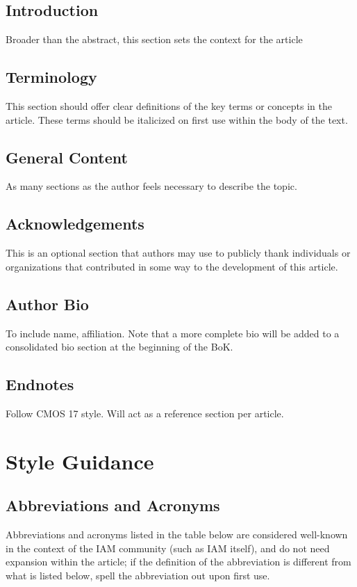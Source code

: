 \documentclass[]{article}
\begin{document}
\subsection{Introduction}
Broader than the abstract, this section sets the context for the article

\subsection{Terminology}
This section should offer clear definitions of the key terms or concepts in the article. These terms should be italicized on first use within the body of the text.

\subsection{General Content}
As many sections as the author feels necessary to describe the topic.

\subsection{Acknowledgements}
This is an optional section that authors may use to publicly thank individuals or organizations that contributed in some way to the development of this article.

\subsection{Author Bio}
To include name, affiliation. Note that a more complete bio will be added to a consolidated bio section at the beginning of the BoK.

\subsection{Endnotes}
Follow CMOS 17 style. Will act as a reference section per article. 


\section{Style Guidance}
\subsection{Abbreviations and Acronyms}
Abbreviations and acronyms listed in the table below are considered well-known in the context of the IAM community (such as IAM itself), and do not need expansion within the article; if the definition of the abbreviation is different from what is listed below, spell the abbreviation out upon first use.
\end{document}
